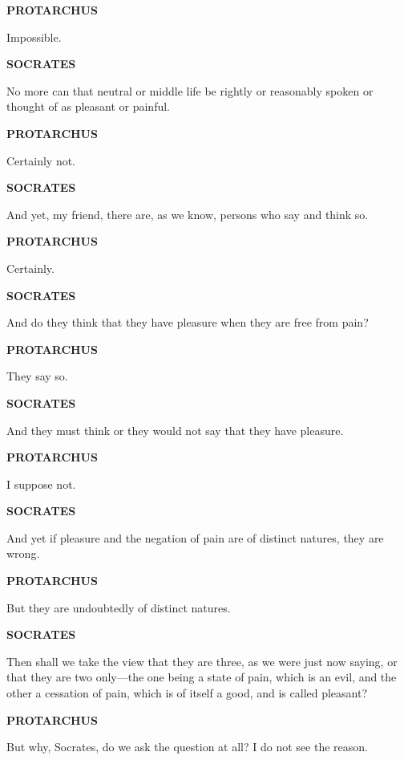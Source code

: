 \documentclass[11pt,letter]{article}
\begin{document}
\par \textbf{PROTARCHUS}
\par   Impossible.

\par \textbf{SOCRATES}
\par   No more can that neutral or middle life be rightly or reasonably spoken or thought of as pleasant or painful.

\par \textbf{PROTARCHUS}
\par   Certainly not.

\par \textbf{SOCRATES}
\par   And yet, my friend, there are, as we know, persons who say and think so.

\par \textbf{PROTARCHUS}
\par   Certainly.

\par \textbf{SOCRATES}
\par   And do they think that they have pleasure when they are free from pain?

\par \textbf{PROTARCHUS}
\par   They say so.

\par \textbf{SOCRATES}
\par   And they must think or they would not say that they have pleasure.

\par \textbf{PROTARCHUS}
\par   I suppose not.

\par \textbf{SOCRATES}
\par   And yet if pleasure and the negation of pain are of distinct natures, they are wrong.

\par \textbf{PROTARCHUS}
\par   But they are undoubtedly of distinct natures.

\par \textbf{SOCRATES}
\par   Then shall we take the view that they are three, as we were just now saying, or that they are two only—the one being a state of pain, which is an evil, and the other a cessation of pain, which is of itself a good, and is called pleasant?

\par \textbf{PROTARCHUS}
\par   But why, Socrates, do we ask the question at all? I do not see the reason.
\end{document}
